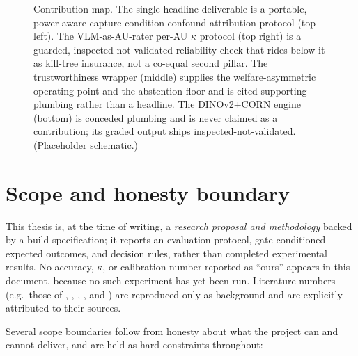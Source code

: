\begin{figure}[t]
  \caption[Thesis contribution map]{Contribution map. The single headline
    deliverable is a portable, power-aware capture-condition
    confound-attribution protocol (top left). The VLM-as-AU-rater per-AU
    $\kappa$ protocol (top right) is a guarded, inspected-not-validated
    reliability check that rides below it as kill-tree insurance, not a co-equal
    second pillar. The trustworthiness wrapper (middle) supplies the
    welfare-asymmetric operating point and the abstention floor and is cited
    supporting plumbing rather than a headline. The DINOv2$+$CORN engine
    (bottom) is conceded plumbing and is never claimed as a contribution; its
    graded output ships inspected-not-validated. (Placeholder schematic.)}
  \label{fig:contribution-map}
\end{figure}

\section{Scope and honesty boundary}
\label{sec:intro-scope}

This thesis is, at the time of writing, a \emph{research proposal and methodology}
backed by a build specification; it reports an evaluation protocol, gate-conditioned
expected outcomes, and decision rules, rather than completed experimental results.
No accuracy, $\kappa$, or calibration number reported as ``ours'' appears in this
document, because no such experiment has yet been run. Literature numbers
(e.g.\ those of \textcite{evangelista2019}, \textcite{steagall2023},
\textcite{feighelstein2023}, \textcite{martvel2024catflw}, and
\textcite{chavoshi2025}) are reproduced only as background and are explicitly
attributed to their sources.

Several scope boundaries follow from honesty about what the project can and cannot
deliver, and are held as hard constraints throughout:

